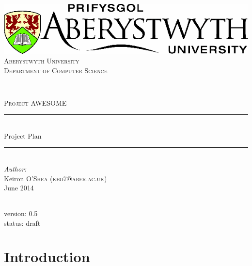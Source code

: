 \documentclass[11pt,a4paper]{article}
\begin{document}

\begin{titlepage}

\newcommand{\HRule}{\rule{\linewidth}{0.5mm}} %

\center %

\includegraphics[scale=0.4]{images/aber.png} \\[1.5cm] %
\textsc{\Large Aberystwyth University
 \\[0.5cm] Department of Computer Science}

\

\textsc{\Large Project AWESOME}\\

\HRule \\[0.4cm]
{ \huge  Project Plan}\\[0.4cm] %
\HRule \\[1.5cm]

\Large \emph{Author:}\\
Keiron \textsc{O'Shea (keo7@aber.ac.uk)}\\[1cm] %

{\large June 2014}\\[2cm] %

\


\small version: 0.5 \\
\small status: draft


\vfill %

\end{titlepage}

\thispagestyle{plain}	

\tableofcontents

\clearpage


\clearpage

\section{Introduction}
\end{document}
